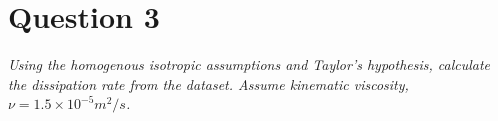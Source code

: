 \section*{Question 3}
\textit{Using the homogenous isotropic assumptions and Taylor's hypothesis, calculate the dissipation rate from the dataset. Assume kinematic viscosity, $\nu = 1.5 \times 10^{-5} m^2/s$.}
